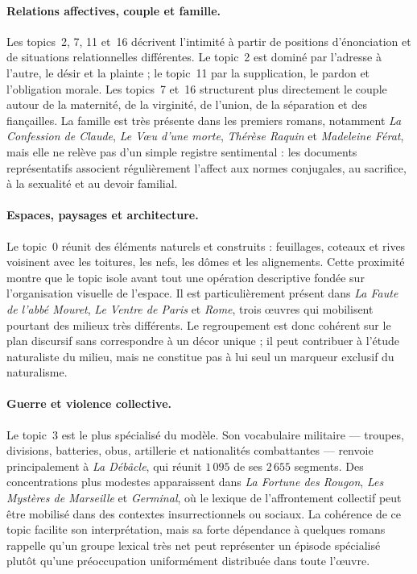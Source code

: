 \paragraph{Relations affectives, couple et famille.} Les topics~2, 7, 11 et~16 décrivent l'intimité à partir de positions d'énonciation et de situations relationnelles différentes. Le topic~2 est dominé par l'adresse à l'autre, le désir et la plainte ; le topic~11 par la supplication, le pardon et l'obligation morale. Les topics~7 et~16 structurent plus directement le couple autour de la maternité, de la virginité, de l'union, de la séparation et des fiançailles. La famille est très présente dans les premiers romans, notamment \textit{La Confession de Claude}, \textit{Le Vœu d'une morte}, \textit{Thérèse Raquin} et \textit{Madeleine Férat}, mais elle ne relève pas d'un simple registre sentimental : les documents représentatifs associent régulièrement l'affect aux normes conjugales, au sacrifice, à la sexualité et au devoir familial.

\paragraph{Espaces, paysages et architecture.} Le topic~0 réunit des éléments naturels et construits : feuillages, coteaux et rives voisinent avec les toitures, les nefs, les dômes et les alignements. Cette proximité montre que le topic isole avant tout une opération descriptive fondée sur l'organisation visuelle de l'espace. Il est particulièrement présent dans \textit{La Faute de l'abbé Mouret}, \textit{Le Ventre de Paris} et \textit{Rome}, trois œuvres qui mobilisent pourtant des milieux très différents. Le regroupement est donc cohérent sur le plan discursif sans correspondre à un décor unique ; il peut contribuer à l'étude naturaliste du milieu, mais ne constitue pas à lui seul un marqueur exclusif du naturalisme.

\paragraph{Guerre et violence collective.} Le topic~3 est le plus spécialisé du modèle. Son vocabulaire militaire --- troupes, divisions, batteries, obus, artillerie et nationalités combattantes --- renvoie principalement à \textit{La Débâcle}, qui réunit \(1\,095\) de ses \(2\,655\) segments. Des concentrations plus modestes apparaissent dans \textit{La Fortune des Rougon}, \textit{Les Mystères de Marseille} et \textit{Germinal}, où le lexique de l'affrontement collectif peut être mobilisé dans des contextes insurrectionnels ou sociaux. La cohérence de ce topic facilite son interprétation, mais sa forte dépendance à quelques romans rappelle qu'un groupe lexical très net peut représenter un épisode spécialisé plutôt qu'une préoccupation uniformément distribuée dans toute l'œuvre.

